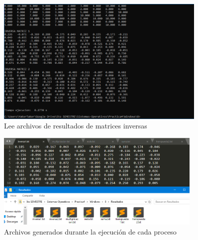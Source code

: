 \documentclass[12pt]{article}
\begin{document}
\begin{itemize}
\begin{itemize}
\begin{figure}[h!]
                        \includegraphics[width=0.9\textwidth]{Practica4/Images/Windows/8_7.PNG}
                        \caption{Lee archivos de resultados de matrices inversas}
                        
                        
                        
                    \end{figure}
                    \newpage
                   \begin{figure}[h!]
                        \centering \includegraphics[width=0.88\textwidth]{Practica4/Images/Windows/8_8.PNG}
                        \caption{Archivos generados durante la ejecución de cada proceso}
                    \end{figure}
                        
                \end{itemize}
            
        \end{itemize}
        
         
\end{document}
